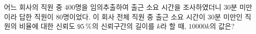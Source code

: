 어느 회사의 직원 중 400명을 임의추출하여 출근 소요 시간을 조사하였더니 30분 미만이라 답한 직원이 80명이었다. 이 회사 전체 직원 중 출근 소요 시간이 30분 미만인 직원의 비율에 대한 신뢰도 $95\mkern3mu \%$의 신뢰구간의 길이를 $k$라 할 때, $10000k$의 값은? 
